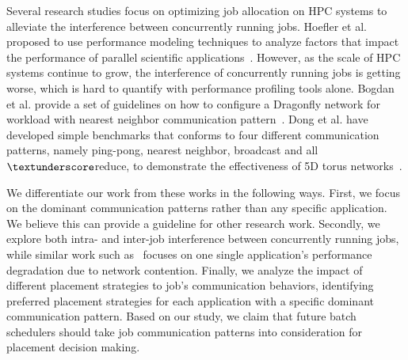 Several research studies focus on optimizing job allocation on HPC systems 
to alleviate the interference between concurrently running jobs. 
Hoefler et al. proposed to use performance modeling techniques to analyze factors that 
impact the performance of parallel scientific applications~\cite{hoefler-modeling}. 
However, as the scale of HPC systems continue to grow, 
the interference of concurrently running jobs is getting worse, 
which is hard to quantify with performance profiling tools alone. 
Bogdan et al. provide a set of guidelines on how to configure a Dragonfly network 
for workload with nearest neighbor communication pattern~\cite{Bogdan-hpdc14}. 
Dong et al. have developed simple benchmarks that conforms to four different communication patterns, 
namely ping-pong, nearest neighbor, broadcast and all$\textunderscore$reduce, 
to demonstrate the effectiveness of 5D torus networks~\cite{Dong-SC11}.

We differentiate our work from these works in the following ways. 
First, we focus on the dominant communication patterns rather than any specific application. 
We believe this can provide a guideline for other research work. 
Secondly, we explore both intra- and inter-job interference between concurrently running jobs, 
while similar work such as~\cite{abhinav-sc13} focuses 
on one single application's performance degradation due to network contention. 
Finally, we analyze the impact of different placement strategies to job's communication behaviors, 
identifying preferred placement strategies for 
each application with a specific dominant communication pattern. 
Based on our study, we claim that future batch schedulers should take 
job communication patterns into consideration for placement decision making. 

